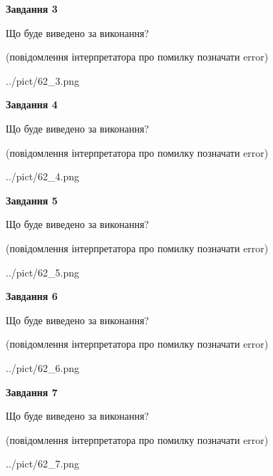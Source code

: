 \documentclass[12pt, ukrainian]{article}
\begin{document}
{\begin {large}
{\begin {center}\textbf{Завдання 3}\end {center}}\par
Що буде виведено за виконання?\par
 (повідомлення інтерпретатора про помилку позначати error)\par
\begin{center}
	{../pict/62_3.png}
\end{center}
\newpage

{\begin {center}\textbf{Завдання 4}\end {center}}\par
Що буде виведено за виконання?\par
 (повідомлення інтерпретатора про помилку позначати error)\par
\begin{center}
	{../pict/62_4.png}
\end{center}
\newpage

{\begin {center}\textbf{Завдання 5}\end {center}}\par
Що буде виведено за виконання?\par
 (повідомлення інтерпретатора про помилку позначати error)\par
\begin{center}
	{../pict/62_5.png}
\end{center}
\newpage

{\begin {center}\textbf{Завдання 6}\end {center}}\par
Що буде виведено за виконання?\par
 (повідомлення інтерпретатора про помилку позначати error)\par
\begin{center}
	{../pict/62_6.png}
\end{center}
\newpage

{\begin {center}\textbf{Завдання 7}\end {center}}\par
Що буде виведено за виконання?\par
 (повідомлення інтерпретатора про помилку позначати error)\par
\begin{center}
	{../pict/62_7.png}
\end{center}
\newpage


\end{large}}
\end{document}
